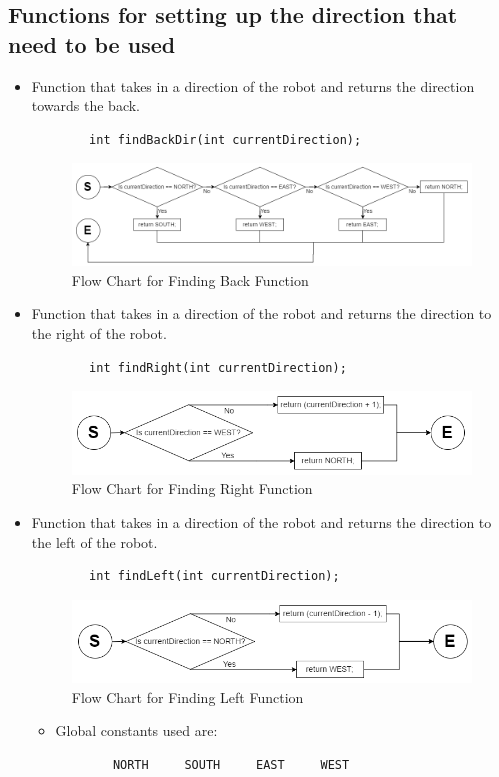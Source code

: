 \documentclass[11pt]{article}
\begin{document}

\subsection{Functions for setting up the direction that need to be used}
\begin{itemize}
\item Function that takes in a direction of the robot and returns the direction towards the back.
	\begin{verbatim}
		int findBackDir(int currentDirection);
	\end{verbatim}
\begin{figure}[htp]
\centering
\includegraphics[scale=0.45]{images/Software_Flowchart/findBackDir.png}
\caption{Flow Chart for Finding Back Function}
\label{}
\end{figure}
\item Function that takes in a direction of the robot and returns the direction to the right of the robot.
	\begin{verbatim}
		int findRight(int currentDirection);
	\end{verbatim}
\begin{figure}[htp]
\centering
\includegraphics[scale=0.47]{images/Software_Flowchart/findRight.png}
\caption{Flow Chart for Finding Right Function}
\label{}
\end{figure}	
\item Function that takes in a direction of the robot and returns the direction to the left of the robot.
	\begin{verbatim}
		int findLeft(int currentDirection);
	\end{verbatim}
\begin{figure}[htp]
\centering
\includegraphics[scale=0.48]{images/Software_Flowchart/findLeft.png}
\caption{Flow Chart for Finding Left Function}
\label{}
\end{figure}
	\begin{itemize}
	\item Global constants used are:
	\begin{verbatim}
		NORTH     SOUTH     EAST     WEST
	\end{verbatim}
	\end{itemize}
\end{itemize}
\end{document}
